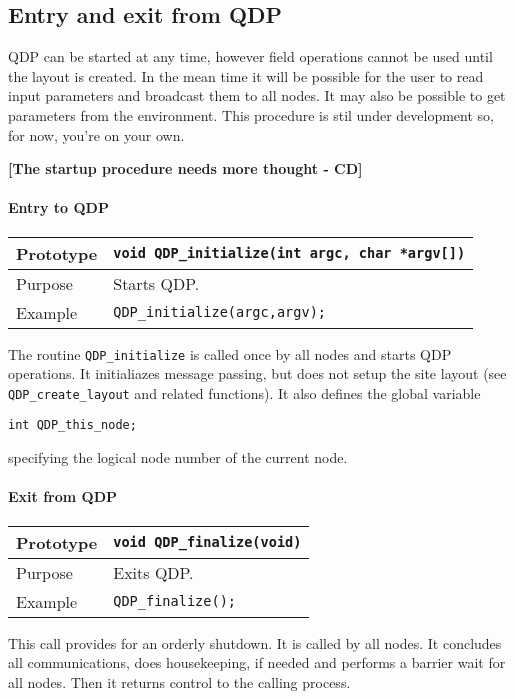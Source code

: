 \documentclass{article}
\begin{document}
\subsection{Entry and exit from QDP}

QDP can be started at any time, however field operations cannot be
used until the layout is created.
In the mean time it will be possible for the user to read input parameters
and broadcast them to all nodes.
It may also be possible to get parameters from the environment.
This procedure is stil under development so, for now, you're on your own.

{\bf [The startup procedure needs more thought - CD]}

\paragraph{Entry to QDP}

\begin{flushleft}
  \begin{tabular}{|l|l|}
  \hline
  Prototype      & \verb|void QDP_initialize(int argc, char *argv[])|\\
    \hline
  Purpose        & Starts QDP. \\
\hline
  Example  & \verb|QDP_initialize(argc,argv);| \\
   \hline
 \end{tabular}
\end{flushleft}
%
The routine \verb|QDP_initialize| is called once by all nodes and
starts QDP operations.
It initialiazes message passing, but does not setup the site layout
(see \verb|QDP_create_layout| and related functions).
It also defines the global variable
%
\begin{verbatim}
int QDP_this_node;
\end{verbatim}
%
specifying the logical node number of the current node.

\paragraph{Exit from QDP}

\begin{flushleft}
  \begin{tabular}{|l|l|}
  \hline
  Prototype      & \verb|void QDP_finalize(void)|\\
    \hline
  Purpose        & Exits QDP. \\
\hline
  Example  & \verb|QDP_finalize();| \\
   \hline
 \end{tabular}
\end{flushleft}
%
This call provides for an orderly shutdown.  It is called by all
nodes. It concludes all communications, does housekeeping, if needed
and performs a barrier wait for all nodes.  Then it returns control to
the calling process.
\end{document}
